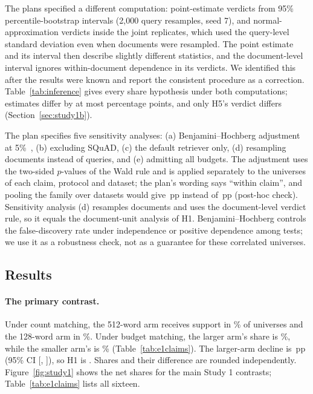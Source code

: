 \documentclass[11pt]{article}
\newcommand{\pp}{\ensuremath{\,\mathrm{pp}}}
\begin{document}
The plans specified a different computation: point-estimate verdicts from 95\% percentile-bootstrap intervals (2,000 query resamples, seed 7), and normal-approximation verdicts inside the joint replicates, which used the query-level standard deviation even when documents were resampled. The point estimate and its interval then describe slightly different statistics, and the document-level interval ignores within-document dependence in its verdicts. We identified this after the results were known and report the consistent procedure as a correction. Table~\ref{tab:inference} gives every share hypothesis under both computations; estimates differ by at most \InferenceShiftMax{} percentage points, and only H5's verdict differs (Section~\ref{sec:study1b}).

The plan specifies five sensitivity analyses: (a) Benjamini--Hochberg adjustment at 5\%~\cite{benjamini1995fdr}, (b) excluding SQuAD, (c) the default retriever only, (d) resampling documents instead of queries, and (e) admitting all budgets. The adjustment uses the two-sided $p$-values of the Wald rule and is applied separately to the universes of each claim, protocol and dataset; the plan's wording says ``within claim'', and pooling the family over datasets would give \SensBHPooledEst\pp{} instead of \SensBHEst\pp{} (post-hoc check). Sensitivity analysis (d) resamples documents and uses the document-level verdict rule, so it equals the document-unit analysis of H1. Benjamini--Hochberg controls the false-discovery rate under independence or positive dependence among tests; we use it as a robustness check, not as a guarantee for these correlated universes.

\subsection{Results}
\paragraph{The primary contrast.}
Under count matching, the 512-word arm receives support in \PoneCountFiveTwelve\% of universes and the 128-word arm in \PoneCountOneTwoEight\%. Under budget matching, the larger arm's share is \PoneBudgetFiveTwelve\%, while the smaller arm's is \PoneBudgetOneTwoEight\% (Table~\ref{tab:e1claims}). The larger-arm decline is \HOneEst\pp{} (95\% CI [\HOneLo, \HOneHi]), so H1 is \HOneVerdict. Shares and their difference are rounded independently. Figure~\ref{fig:study1} shows the net shares for the main Study 1 contrasts; Table~\ref{tab:e1claims} lists all sixteen.
\end{document}
